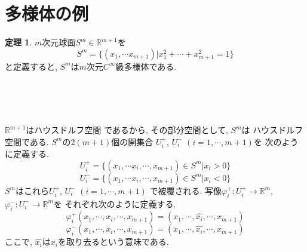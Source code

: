 \documentclass[dvipdfmx,cjk]{beamer}
\theoremstyle{definition}
\newtheorem{thm}[dfn]{\textbf{ 定理 }}
\begin{document}
  \section{多様体の例}
  \begin{frame}
  \begin{thm}
    $m$次元球面$S^m \in \mathbb{R}^{m+1}$を
    $$S^m=\{(x_1,\cdots x_{m+1})|x_1^2+\cdots +x_{m+1}^2=1\}$$
    と定義すると, $S^m$は$m$次元$C^{\infty}$級多様体である. 
  \end{thm}
  \ \\
  \ \\
  \ \\

\end{frame}
  \begin{frame}
    $\mathbb{R}^{m+1}$はハウスドルフ空間
        であるから, その部分空間として, $S^m$は
        ハウスドルフ空間である. 
        $S^m$の$2(m+1)$個の開集合
        $U_i^+$, $U_i^-$ $(i=1,\cdots ,m+1)$を
        次のように定義する. 
        $$U_i^+ = \{(x_1, \cdots x_i, \cdots ,x_{m+1})\in S^m|x_i>0\}$$
        $$U_i^- = \{(x_1, \cdots x_i, \cdots ,x_{m+1})\in S^m|x_i<0\}$$
        $S^m$はこれら$U_i^+$, $U_i^-$ $(i=1,\cdots ,m+1)$
        で被覆される. 写像$\varphi_i^+:U_i^+ \rightarrow \mathbb{R}^m$, 
        $\varphi_i^-:U_i^- \rightarrow \mathbb{R}^m$を
        それぞれ次のように定義する. 
        $$\varphi_i^+(x_1,\cdots ,x_i,\cdots, x_{m+1})=(x_1,\cdots ,\hat{x_i},\cdots ,x_{m+1})$$
        $$\varphi_i^-(x_1,\cdots ,x_i,\cdots, x_{m+1})=(x_1,\cdots ,\hat{x_i},\cdots ,x_{m+1})$$
        ここで, $\hat{x_i}$は$x_i$を取り去るという意味である. 
      \end{frame}
\end{document}
